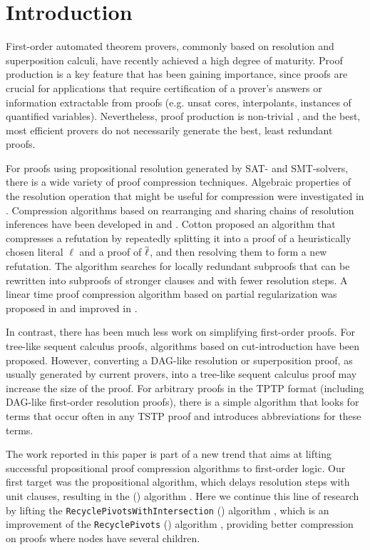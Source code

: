 \section{Introduction} 

First-order automated theorem provers, commonly based on resolution and superposition calculi, have recently achieved a high degree of maturity. Proof production is a key feature that has been gaining importance, since proofs are crucial for applications that require certification of a prover's answers or information extractable from proofs (e.g. unsat cores, interpolants, instances of quantified variables). Nevertheless, proof production is non-trivial \cite{SchulzAPPA}, and the best, most efficient provers do not necessarily generate the best, least redundant proofs.

For proofs using propositional resolution generated by SAT- and SMT-solvers, there is a wide variety of proof compression techniques. Algebraic properties of the resolution operation that might be useful for compression were investigated in \cite{bwp10}.
Compression algorithms based on rearranging and sharing chains of resolution inferences have been
developed in \cite{Amjad07} and \cite{Sinz}.  Cotton \cite{CottonSplit} proposed an algorithm that
compresses a refutation by repeatedly splitting it into a proof of a heuristically chosen literal $\ell$
and a proof of $\overline{\ell}$, and then resolving them to form a new refutation.  The {\ReduceReconstruct} algorithm \cite{RedRec} searches for locally redundant
subproofs that can be rewritten into subproofs of stronger clauses and with fewer resolution steps.
A linear time proof compression algorithm based on partial
regularization was proposed in \cite{RP08} and improved in \cite{LURPI}.

In contrast, there has been much less work on simplifying first-order proofs. For tree-like sequent calculus proofs, algorithms based on cut-introduction \cite{BrunoLPAR,Hetzl} have been proposed. However, converting a DAG-like resolution or superposition proof, as usually generated by current provers, into a tree-like sequent calculus proof may increase the size of the proof. For arbitrary proofs in the TPTP \cite{TPTP} format (including DAG-like first-order resolution proofs), there is a simple algorithm \cite{LPARCzech} that looks for terms that occur often in any TSTP \cite{TPTP} proof and introduces abbreviations for these terms. 


The work reported in this paper is part of a new trend that aims at lifting successful propositional proof compression algorithms to first-order logic. Our first target was the propositional {\LowerUnits} algorithm, which delays resolution steps with unit clauses, resulting in the
{\SFOLowerUnits} 
({\GFOLU}) algorithm \cite{GFOLU}. Here we continue this line of research by lifting the 
\texttt{Recycle\-PivotsWithIntersection}
({\RPI}) algorithm \cite{LURPI}, which is an improvement of the \texttt{RecyclePivots} ({\RP}) algorithm \cite{RP08}, providing better compression on proofs where nodes have several children. 

